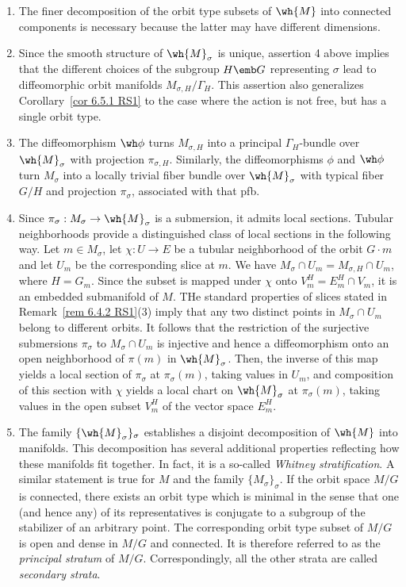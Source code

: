 \begin{rem}[{{\cite[Rem.~6.6.2]{RS1}}}]
    \begin{enumerate}
        \item The finer decomposition of the orbit type subsets of $\wh{M}$ into connected components is necessary because the latter may have different dimensions.
        \item Since the smooth structure of $\wh{M}_\sigma$ is unique, assertion 4 above implies that the different choices of the subgroup $H\emb G$ representing $\sigma$ lead to diffeomorphic orbit manifolds $M_{\sigma,H}\slash\Gamma_H$. This assertion also generalizes Corollary~\ref{cor 6.5.1 RS1} to the case where the action is not free, but has a single orbit type.
        \item The diffeomorphism $\wh\phi$ turns $M_{\sigma,H}$ into a principal $\Gamma_H$-bundle over $\wh{M}_\sigma$ with projection $\pi_{\sigma,H}$. Similarly, the diffeomorphisms $\phi$ and $\wh\phi$ turn $M_\sigma$ into a locally trivial fiber bundle over $\wh{M}_\sigma$ with typical fiber $G\slash H$ and projection $\pi_\sigma$, associated with that \gls{pfb}.
        \item Since $\pi_\sigma:M_\sigma\to\wh{M}_\sigma$ is a submersion, it admits local sections. Tubular neighborhoods provide a distinguished class of local sections in the following way. Let $m\in M_\sigma$, let $\chi:U\to E$ be a tubular neighborhood of the orbit $G\cdot m$ and let $U_m$ be the corresponding slice at $m$. We have $M_\sigma\cap U_m=M_{\sigma,H}\cap U_m$, where $H=G_m$. Since the subset is mapped under $\chi$ onto $V_m^H=E_m^H\cap V_m$, it is an embedded submanifold of $M$. THe standard properties of slices stated in Remark~\ref{rem 6.4.2 RS1}(3) imply that any two distinct points in $M_\sigma\cap U_m$ belong to different orbits. It follows that the restriction of the surjective submersions $\pi_\sigma$ to $M_\sigma\cap U_m$ is injective and hence a diffeomorphism onto an open neighborhood of $\pi(m)$ in $\wh{M}_\sigma$. Then, the inverse of this map yields a local section of $\pi_\sigma$ at $\pi_\sigma(m)$, taking values in $U_m$, and composition of this section with $\chi$ yields a local chart on $\wh{M}_\sigma$ at $\pi_\sigma(m)$, taking values in the open subset $V^H_m$ of the vector space $E_m^H$.
        \item The family $\{\wh{M}_\sigma\}_\sigma$ establishes a disjoint decomposition of $\wh{M}$ into manifolds. This decomposition has several additional properties reflecting how these manifolds fit together. In fact, it is a so-called \emph{Whitney stratification}. A similar statement is true for $M$ and the family $\{M_\sigma\}_\sigma$. If the orbit space $M\slash G$ is connected, there exists an orbit type which is minimal in the sense that one (and hence any) of its representatives is conjugate  to a subgroup of the stabilizer of an arbitrary point. The corresponding orbit type subset of $M\slash G$ is open and dense in $M\slash G$ and connected. It is therefore referred to as the \emph{principal stratum} of $M\slash G$. Correspondingly, all the other strata are called \emph{secondary strata}.
    \end{enumerate}
\end{rem}

